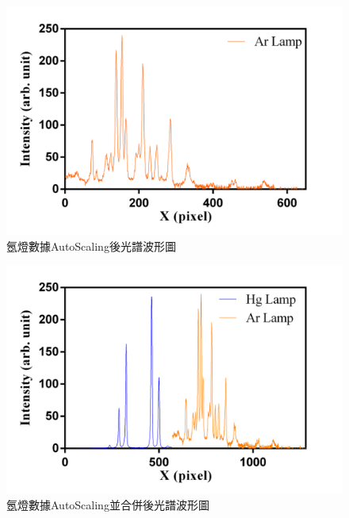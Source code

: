 \begin{figure}[H] %
	\centering %
	\vspace{0.8cm}
	\setlength{\abovecaptionskip}{0.cm}
	\includegraphics[width=15cm]{figures/ArLamp.png} %
	\caption{氬燈數據AutoScaling後光譜波形圖} %
	\label{氬燈數據AutoScaling後光譜波形圖} %
\end{figure}

\begin{figure}[H] %
	\centering %
	\setlength{\abovecaptionskip}{0.cm}
	\includegraphics[width=15cm]{figures/Comebine_ArLamp.png} %
	\caption{氬燈數據AutoScaling並合併後光譜波形圖} %
	\label{氬燈數據AutoScaling並合併後光譜波形圖} %
\end{figure}

